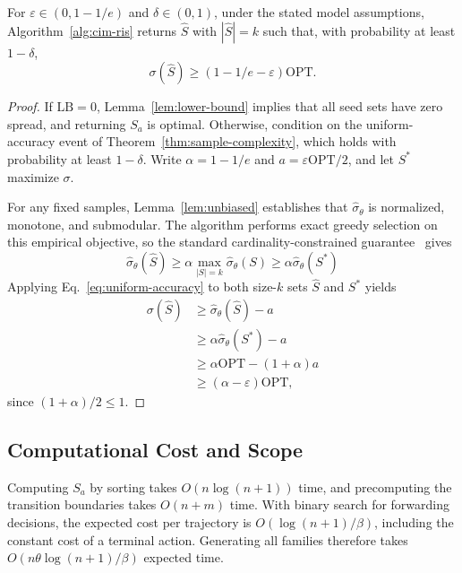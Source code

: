 \documentclass[sigconf]{acmart}
\begin{document}
\begin{theorem}
\label{thm:approx}
For $\varepsilon\in(0,1-1/e)$ and $\delta\in(0,1)$, under the
stated model assumptions, Algorithm~\ref{alg:cim-ris} returns
$\hat S$ with $|\hat S|=k$ such that, with probability at least
$1-\delta$,
\begin{equation}
\label{eq:approx-bound}
 \sigma(\hat S)\ge(1-1/e-\varepsilon)\mathrm{OPT}.
\end{equation}
\end{theorem}
\begin{proof}\renewcommand{\qedsymbol}{}
If $\mathrm{LB}=0$, Lemma~\ref{lem:lower-bound} implies that
all seed sets have zero spread, and returning $S_a$ is optimal.
Otherwise, condition on the uniform-accuracy event of
Theorem~\ref{thm:sample-complexity}, which holds with probability
at least $1-\delta$. Write $\alpha=1-1/e$ and
$a=\varepsilon\mathrm{OPT}/2$, and let $S^*$ maximize $\sigma$.

For any fixed samples, Lemma~\ref{lem:unbiased} establishes that
$\hat\sigma_\theta$ is normalized, monotone, and submodular.
The algorithm performs exact greedy selection on this empirical
objective, so the standard cardinality-constrained guarantee~\cite{nemhauser1978analysis} gives
\[
 \hat\sigma_\theta(\hat S)
 \ge\alpha\max_{|S|=k}\hat\sigma_\theta(S)
 \ge\alpha\hat\sigma_\theta(S^*)
\]
Applying Eq.~\eqref{eq:uniform-accuracy} to both size-$k$ sets
$\hat S$ and $S^*$ yields
\begin{align*}
 \sigma(\hat S)
 &\ge\hat\sigma_\theta(\hat S)-a\\
 &\ge\alpha\hat\sigma_\theta(S^*)-a\\
 &\ge\alpha\mathrm{OPT}-(1+\alpha)a\\
 &\ge(\alpha-\varepsilon)\mathrm{OPT},
\end{align*}
since $(1+\alpha)/2\le1$.
\end{proof}

\subsection{Computational Cost and Scope}
\label{sec:discussion-sampling}

Computing $S_a$ by sorting takes $O(n\log(n+1))$ time, and
precomputing the transition boundaries takes $O(n+m)$ time.
With binary search for forwarding decisions, the expected cost
per trajectory is $O(\log(n+1)/\beta)$, including the constant
cost of a terminal action. Generating all families therefore
takes $O(n\theta\log(n+1)/\beta)$ expected time.
\end{document}
